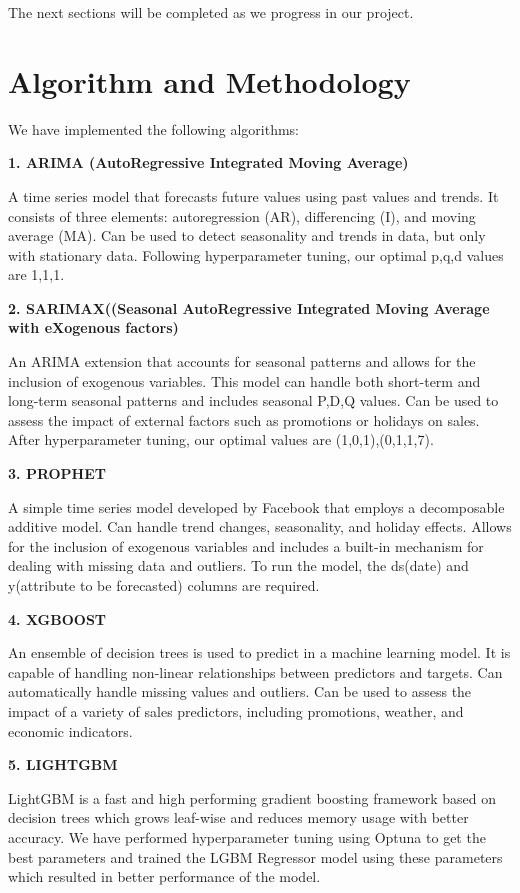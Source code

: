 \documentclass[fleqn,10pt]{SelfArx} %
\begin{document}
\item The next sections will be completed as we progress in our project.
\bigskip
\bigskip


\section{Algorithm and Methodology}
We have implemented the following algorithms: 
\item \textbf {1. ARIMA (AutoRegressive Integrated Moving Average)}
\item A time series model that forecasts future values using past values and trends.
It consists of three elements: autoregression (AR), differencing (I), and moving average (MA).
Can be used to detect seasonality and trends in data, but only with stationary data.
Following hyperparameter tuning, our optimal p,q,d values are 1,1,1.
\item \textbf {2. SARIMAX((Seasonal AutoRegressive Integrated Moving Average with eXogenous factors)}
\item An ARIMA extension that accounts for seasonal patterns and allows for the inclusion of exogenous variables.
This model can handle both short-term and long-term seasonal patterns and includes seasonal P,D,Q values.
Can be used to assess the impact of external factors such as promotions or holidays on sales.
After hyperparameter tuning, our optimal values are (1,0,1),(0,1,1,7).
\item \textbf {3. PROPHET }
\item A simple time series model developed by Facebook that employs a decomposable additive model.
Can handle trend changes, seasonality, and holiday effects.
Allows for the inclusion of exogenous variables and includes a built-in mechanism for dealing with missing data and outliers.
To run the model, the ds(date) and y(attribute to be forecasted) columns are required.
\item \textbf {4. XGBOOST }
\item An ensemble of decision trees is used to predict in a machine learning model.
It is capable of handling non-linear relationships between predictors and targets.
Can automatically handle missing values and outliers.
Can be used to assess the impact of a variety of sales predictors, including promotions, weather, and economic indicators.
\item \textbf {5. LIGHTGBM }
\item LightGBM is a fast and high performing gradient boosting framework based on decision trees which grows leaf-wise and reduces memory usage with better accuracy. We have performed hyperparameter tuning using Optuna to get the best parameters and trained the LGBM Regressor model using these parameters which resulted in better performance of the model.
\end{document}

